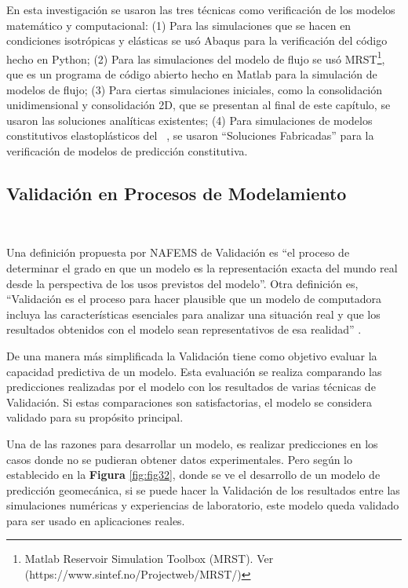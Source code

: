 En esta investigación se usaron las tres técnicas como verificación de los modelos matemático y computacional: (1) Para las simulaciones que se hacen en condiciones isotrópicas y elásticas se usó Abaqus para la verificación del código hecho en Python; (2) Para las simulaciones del modelo de flujo se usó MRST\footnote{Matlab Reservoir Simulation Toolbox (MRST). Ver (https://www.sintef.no/Projectweb/MRST/)}, que es un programa de código abierto hecho en Matlab para la simulación de modelos de flujo; (3) Para ciertas simulaciones iniciales, como la consolidación unidimensional y consolidación 2D, que se presentan al final de este capítulo, se usaron las soluciones analíticas existentes; (4) Para simulaciones de modelos constitutivos elastoplásticos del ~, se usaron “Soluciones Fabricadas” para la verificación de modelos de predicción constitutiva.\bigskip



\subsection{Validación en Procesos de Modelamiento}~\hypertarget{sec:sec233}{}
\label{sec:sec233}

Una definición propuesta por NAFEMS de Validación es “el proceso de determinar el grado en que un modelo es la representación exacta del mundo real desde la perspectiva de los usos previstos del modelo”. Otra definición es, “Validación es el proceso para hacer plausible que un modelo de computadora incluya las características esenciales para analizar una situación real y que los resultados obtenidos con el modelo sean representativos de esa realidad” \cite{R.B.J.2013ValidationAnalysis}.\bigskip

De una manera más simplificada la Validación tiene como objetivo evaluar la capacidad predictiva de un modelo. Esta evaluación se realiza comparando las predicciones realizadas por el modelo con los resultados de varias técnicas de Validación. Si estas comparaciones son satisfactorias, el modelo se considera validado para su propósito principal.\bigskip

Una de las razones para desarrollar un modelo, es realizar predicciones en los casos donde no se pudieran obtener datos experimentales. Pero según lo establecido en la \textbf{Figura} \ref{fig:fig32}, donde se ve el desarrollo de un modelo de predicción geomecánica, si se puede hacer la Validación de los resultados entre las simulaciones numéricas y experiencias de laboratorio, este modelo queda validado para ser usado en aplicaciones reales.\bigskip

